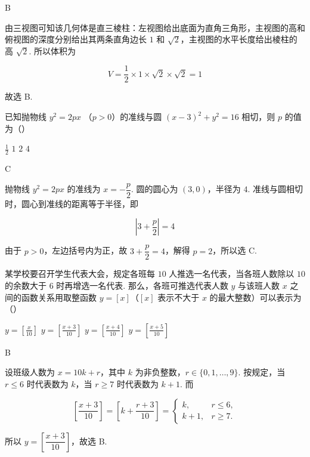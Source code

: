 \begin{answer}
B
\end{answer}

\begin{solution}
由三视图可知该几何体是直三棱柱：左视图给出底面为直角三角形，主视图的高和俯视图的深度分别给出其两条直角边长 \(1\) 和 \(\sqrt2\)，主视图的水平长度给出棱柱的高 \(\sqrt2\). 所以体积为

\[
V=\frac12\times1\times\sqrt2\times\sqrt2=1
\]

故选 B.
\end{solution}

\begin{problem}
已知抛物线 \( y^{2}=2px \) （\(p>0\)）的准线与圆 \( (x-3)^{2}+y^{2}=16 \) 相切，则 \(p\) 的值为（\quad）

\choices
    {\( \frac{1}{2} \)}
    {\(1\)}
    {\(2\)}
    {\(4\)}
\end{problem}

\begin{answer}
C
\end{answer}

\begin{solution}
抛物线 \(y^2=2px\) 的准线为 \(x=-\dfrac p2\). 圆的圆心为 \((3,0)\)，半径为 \(4\). 准线与圆相切时，圆心到准线的距离等于半径，即

\[
\left|3+\frac p2\right|=4
\]

由于 \(p>0\)，左边括号内为正，故 \(3+\dfrac p2=4\)，解得 \(p=2\)，所以选 C.
\end{solution}

\begin{problem}
某学校要召开学生代表大会，规定各班每 \(10\) 人推选一名代表，当各班人数除以 \(10\) 的余数大于 \(6\) 时再增选一名代表. 那么，各班可推选代表人数 \( y \) 与该班人数 \( x \) 之间的函数关系用取整函数 \( y = [x] \)（\([x]\) 表示不大于 \( x \) 的最大整数）可以表示为（\quad）

\choices
    {\( y = \left[\frac{x}{10}\right] \)}
    {\( y = \left[\frac{x + 3}{10}\right] \)}
    {\( y = \left[\frac{x + 4}{10}\right] \)}
    {\( y = \left[\frac{x + 5}{10}\right] \)}
\end{problem}

\begin{answer}
B
\end{answer}

\begin{solution}
设班级人数为 \(x=10k+r\)，其中 \(k\) 为非负整数，\(r\in\{0,1,\ldots,9\}\). 按规定，当 \(r\leqslant6\) 时代表数为 \(k\)，当 \(r\geqslant7\) 时代表数为 \(k+1\). 而

\[
\left[\frac{x+3}{10}\right]=\left[k+\frac{r+3}{10}\right]
=\begin{cases}
k,&r\leqslant6,\\
k+1,&r\geqslant7.
\end{cases}
\]

所以 \(y=\left[\dfrac{x+3}{10}\right]\)，故选 B.
\end{solution}

